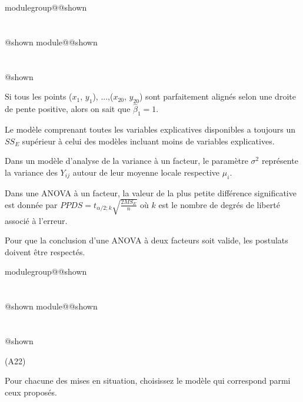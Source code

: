 \documentclass{Evaluation}
\makeatletter
\newcommand{\currentmodulekey}{}
\newcommand{\currentmoduletitle}{}
\newcommand{\currentgroupkey}{}
\newcommand{\currentgrouptitle}{}
\newcommand{\showmoduleifneeded}{%
  \ifx\currentgroupkey\empty\else
    \expandafter\ifx\csname modulegroup@\currentgroupkey @shown\endcsname\relax
      \section*{\currentgrouptitle}%
      \expandafter\gdef\csname modulegroup@\currentgroupkey @shown\endcsname{1}%
    \fi
  \fi
  \expandafter\ifx\csname module@\currentmodulekey @shown\endcsname\relax
    \section*{\currentmoduletitle}%
    \expandafter\gdef\csname module@\currentmodulekey @shown\endcsname{1}%
  \fi
}
\newenvironment{A22}{\showmoduleifneeded}{}
\makeatother
\begin{document}
\begin{questions}
\begin{A22}
\begin{checkboxes}
\CorrectChoice Si tous les points ($x_1$, $y_1$), ...,($x_{20}$, $y_{20}$) sont parfaitement alignés selon une droite de pente positive, alors on sait que $\widehat{\beta}_1 =1$.

\choice Le modèle comprenant toutes les variables explicatives disponibles a toujours un $SS_E$ supérieur à celui des modèles incluant moins de variables explicatives.

\choice Dans un modèle d’analyse de la variance à un facteur, le paramètre $\sigma^2$ représente la variance
des $Y_{ij}$ autour de leur moyenne locale respective $\mu_i$.

\choice Dans une ANOVA à un facteur, la valeur de la plus petite différence significative est donnée par $PPDS=t_{\alpha/2; k} \sqrt{\frac{2MS_E}{n}}$ où $k$ est le nombre de degrés de liberté associé à l'erreur.

\choice Pour que la conclusion d'une ANOVA à deux facteurs soit valide, les postulats doivent être respectés.\medskip
\end{checkboxes}

\medskip

\end{A22}

\begin{A22}
\question
(A22)

Pour chacune des mises en situation, choisissez le modèle qui correspond parmi ceux proposés. 

\medskip

\end{A22}
\end{questions}
\end{document}
